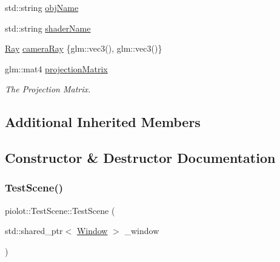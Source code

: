 \begin{DoxyCompactItemize}
\item 
std\+::string \mbox{\hyperlink{classpiolot_1_1_test_scene_ad18ff08a06cd2076ea3b76c4d08867cc}{obj\+Name}}
\item 
std\+::string \mbox{\hyperlink{classpiolot_1_1_test_scene_ae88852d0c8e77c07196e67cc1e93759c}{shader\+Name}}
\item 
\mbox{\hyperlink{classpiolot_1_1_ray}{Ray}} \mbox{\hyperlink{classpiolot_1_1_test_scene_a6a9b96c88caf979ba3e763c11653b290}{camera\+Ray}} \{glm\+::vec3(), glm\+::vec3()\}
\item 
glm\+::mat4 \mbox{\hyperlink{classpiolot_1_1_test_scene_a6f4e922ee3d44c78b879e761dd1c4175}{projection\+Matrix}}
\begin{DoxyCompactList}\small\item\em The Projection Matrix. \end{DoxyCompactList}\end{DoxyCompactItemize}
\subsection*{Additional Inherited Members}


\subsection{Constructor \& Destructor Documentation}
\mbox{\label{classpiolot_1_1_test_scene_a1568f961f1632ccb9da36d14c6aae0d5}} 
\subsubsection{\texorpdfstring{Test\+Scene()}{TestScene()}}
{\footnotesize\ttfamily piolot\+::\+Test\+Scene\+::\+Test\+Scene (\begin{DoxyParamCaption}\item[{std\+::shared\+\_\+ptr$<$ \mbox{\hyperlink{class_window}{Window}} $>$}]{\+\_\+window }\end{DoxyParamCaption})\hspace{0.3cm}{\ttfamily [explicit]}}

\mbox{\label{classpiolot_1_1_test_scene_a615e7e4264391f122ffdf0f997c825f4}} 
